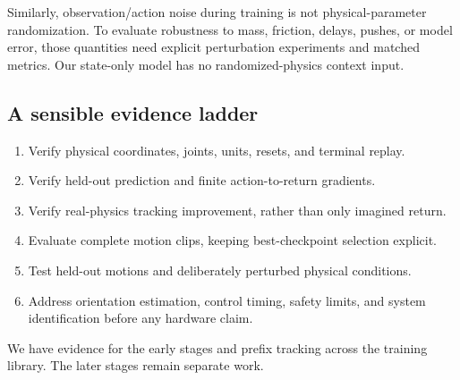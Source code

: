 \documentclass[11pt,a4paper]{article}
\begin{document}
Similarly, observation/action noise during training is not physical-parameter
randomization. To evaluate robustness to mass, friction, delays, pushes, or model
error, those quantities need explicit perturbation experiments and matched
metrics. Our state-only model has no randomized-physics context input.

\subsection{A sensible evidence ladder}
\begin{enumerate}
\item Verify physical coordinates, joints, units, resets, and terminal replay.
\item Verify held-out prediction and finite action-to-return gradients.
\item Verify real-physics tracking improvement, rather than only imagined return.
\item Evaluate complete motion clips, keeping best-checkpoint selection explicit.
\item Test held-out motions and deliberately perturbed physical conditions.
\item Address orientation estimation, control timing, safety limits, and system
identification before any hardware claim.
\end{enumerate}
We have evidence for the early stages and prefix tracking across the training
library. The later stages remain separate work.
\end{document}
